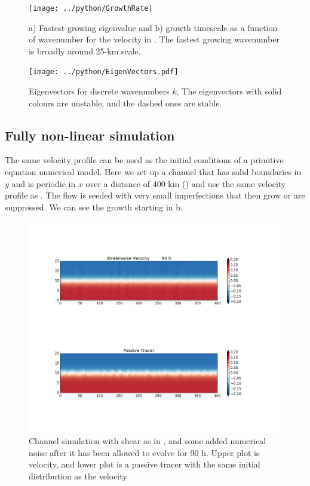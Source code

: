 \documentclass[11pt]{article}
\begin{document}
\begin{figure}[hbtp]
  \begin{center}
    \texttt{[image: ../python/GrowthRate]}
  \end{center}
  \caption{a) Fastest-growing eigenvalue and b) growth timescale as a function of wavenumber for the velocity in .  The fastest growing wavenumber is broadly around 25-km scale.}
  \label{fig:GrowthRate}
\end{figure}

\begin{figure}[hbtp]
  \begin{center}
    \texttt{[image: ../python/EigenVectors.pdf]}
  \end{center}
  \caption{Eigenvectors for discrete wavenumbers $k$.  The eigenvectors with solid colours are unstable, and the dashed ones are stable.}
  \label{fig:EigenVectors}
\end{figure}

\clearpage
\subsection{Fully non-linear simulation}

The same velocity profile can be used as the initial conditions of a primitive equation numerical model.  Here we set up a channel that has solid boundaries in $y$ and is periodic in $x$ over a distance of 400 km () and use the same velocity profile as .  The flow is seeded with very small imperfections that then grow or are suppressed.  We can see the growth starting in b.  

\begin{figure}[hbtp]
  \begin{center}
\includegraphics[width=5in]{images/ChanPar040000324000}
  \end{center}
  \caption{Channel simulation with shear as in , and some added numerical noise after it has been allowed to evolve for 90 h.  Upper plot is velocity, and lower plot is a passive tracer with the same initial distribution as the velocity }
  \label{fig:ChanPar01}
\end{figure}
\end{document}
